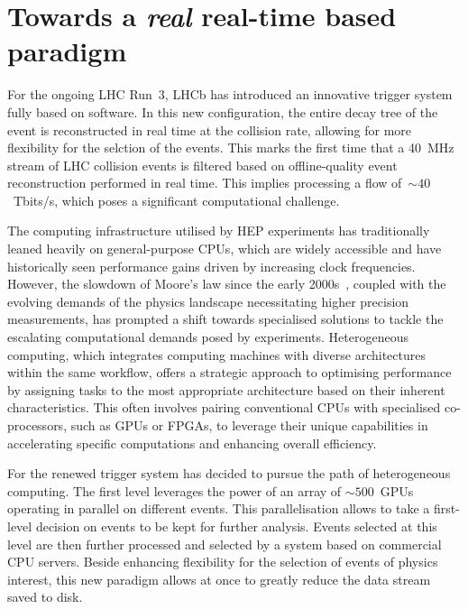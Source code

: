 


\section{Towards a \textit{real} real-time based paradigm}
For the ongoing LHC Run~3, LHCb has introduced an innovative trigger system fully based on software. In this new configuration, the entire decay tree of the event is reconstructed in real time at the collision rate, allowing for more flexibility for the selction of the events. This marks the first time that a \SI{40}{\mega\hertz} stream of LHC collision events is filtered based on offline-quality event reconstruction performed in real time. This implies processing a flow of~$\sim 40$~Tbits/s, which poses a significant computational challenge. 

The computing infrastructure utilised by HEP experiments has traditionally leaned heavily on general-purpose CPUs, which are widely accessible and have historically seen performance gains driven by increasing clock frequencies. However, the slowdown of Moore's law since the early 2000s~\cite{Tuomi_2002}, coupled with the evolving demands of the physics landscape necessitating higher precision measurements, has prompted a shift towards specialised solutions to tackle the escalating computational demands posed by experiments. Heterogeneous computing, which integrates computing machines with diverse architectures within the same workflow, offers a strategic approach to optimising performance by assigning tasks to the most appropriate architecture based on their inherent characteristics. This often involves pairing conventional CPUs with specialised co-processors, such as GPUs or FPGAs, to leverage their unique capabilities in accelerating specific computations and enhancing overall efficiency.

For the renewed trigger system has decided to pursue the path of heterogeneous computing. The first level leverages the power of an array of $\sim 500$~GPUs operating in parallel on different events. This parallelisation allows to take a first-level decision on events to be kept for further analysis. Events selected at this level are then further processed and selected by a system based on commercial CPU servers. Beside enhancing flexibility for the selection of events of physics interest, this new paradigm allows at once to greatly reduce the data stream saved to disk. 

